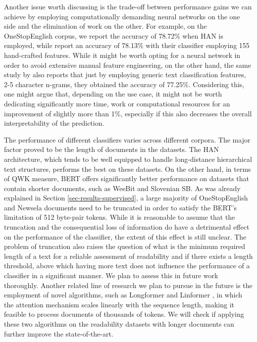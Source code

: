 \documentclass{clv3}
\begin{document}
Another issue worth discussing is the trade-off between performance gains we can achieve by employing computationally demanding neural networks on the one side and the elimination of work on the other. For example, on the OneStopEnglish corpus, we report the accuracy of 78.72\% when HAN is employed, while \citet{vajjala2018onestopenglish} report an accuracy of 78.13\% with their classifier employing 155 hand-crafted features. While it might be worth opting for a neural network in order to avoid extensive manual feature engineering, on the other hand, the same study by \citet{vajjala2018onestopenglish} also reports that just by employing generic text classification features, 2-5 character n-grams, they obtained the accuracy of 77.25\%. Considering this, one might argue that, depending on the use case, it might not be worth dedicating significantly more time, work or computational resources for an improvement of slightly more than 1\%, especially if this also decreases the overall interpretability of the prediction.  

The performance of different classifiers varies across different corpora. The major factor proved to be the length of documents in the datasets. The HAN architecture, which tends to be well equipped to handle long-distance hierarchical text structures, performs the best on these datasets. On the other hand, in terms of QWK measure, BERT offers significantly better performance on datasets that contain shorter documents, such as WeeBit and Slovenian SB. As was already explained in Section \ref{sec-results-supervised}, a large majority of OneStopEnglish and Newsela documents need to be truncated in order to satisfy the BERT's limitation of 512 byte-pair tokens. While it is reasonable to assume that the truncation and the consequential loss of information do have a detrimental effect on the performance of the classifier, the extent of this effect is still unclear. The problem of truncation also raises the question of what is the minimum required length of a text for a reliable assessment of readability and if there exists a length threshold, above which having more text does not influence the performance of a classifier in a significant manner. We plan to assess this in future work thoroughly. Another related line of research we plan to pursue in the future is the employment of novel algorithms, such as Longformer \citep{beltagy2020longformer} and Linformer \citep{wang2020linformer}, in which the attention mechanism scales linearly with the sequence length, making it feasible to process documents of thousands of tokens. We will check if applying these two algorithms on the readability datasets with longer documents can further improve the state-of-the-art.
\end{document}
